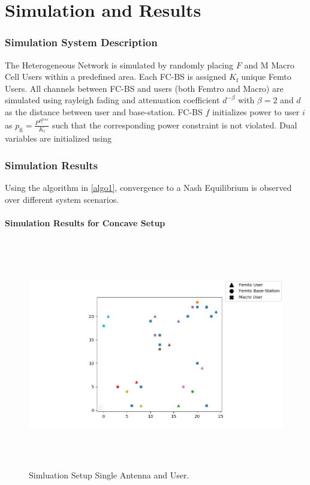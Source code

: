 \documentclass[12pt,a4paper]{report}
\begin{document}
\chapter{Simulation and Results}\label{numerical}
\subsection{Simulation System Description}
The Heterogeneous Network is simulated by randomly placing $F $ and M Macro Cell Users within a predefined area. Each FC-BS is assigned $K_{\mathrm{f}}$ unique Femto Users. All channels between FC-BS and users (both Femtro and Macro) are simulated using rayleigh fading and attenuation coefficient $d^{- \beta}$ with $\beta =2$ and $d$ as the distance between user and base-station.
FC-BS $f$ initializes power to user $i$ as $p_{\mathrm{fi}} = \frac{P^{P_{\mathrm{f}}^{Total}}}{K_{\mathrm{f}}} $ such that the corresponding power constraint is not violated. 
Dual variables are initialized using  



\subsection{Simulation Results}
Using the algorithm in \ref{algo1}, convergence to a Nash Equilibrium is observed over different system scenarios. 
\subsubsection{Simulation Results for Concave Setup}

\begin{figure}[H]
	\includegraphics[width=\textwidth,height = 10cm]{figures/system_figure_single}
	  \caption{Simluation Setup Single Antenna and User.  }
\end{figure}
\end{document}
